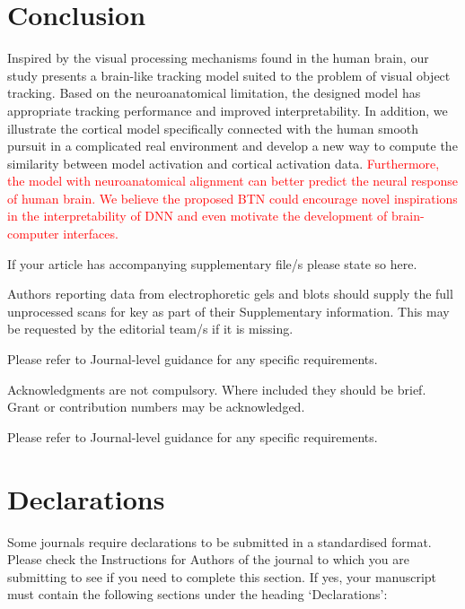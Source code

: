 \documentclass[sn-mathphys]{sn-jnl}%
\theoremstyle{thmstyleone}%
\theoremstyle{thmstyletwo}%
\theoremstyle{thmstylethree}%
\begin{document}
\section{Conclusion}\label{sec13}
Inspired by the visual processing mechanisms found in the human brain, our study presents a brain-like tracking model suited to the problem of visual object tracking. 
Based on the neuroanatomical limitation, the designed model has appropriate tracking performance and improved interpretability. 
In addition, we illustrate the cortical model specifically connected with the human smooth pursuit in a complicated real environment 
and develop a new way to compute the similarity between model activation and cortical activation data. 
\textcolor{red}{
	Furthermore, the model with neuroanatomical alignment can better predict the neural response of human brain. 
	We believe the proposed BTN could encourage novel inspirations in the interpretability of DNN 
	and even motivate the development of brain-computer interfaces.}






\backmatter


If your article has accompanying supplementary file/s please state so here. 

Authors reporting data from electrophoretic gels and blots should supply the full unprocessed scans for key as part of their Supplementary information. This may be requested by the editorial team/s if it is missing.

Please refer to Journal-level guidance for any specific requirements.


Acknowledgments are not compulsory. Where included they should be brief. Grant or contribution numbers may be acknowledged.

Please refer to Journal-level guidance for any specific requirements.

\section*{Declarations}

Some journals require declarations to be submitted in a standardised format. Please check the Instructions for Authors of the journal to which you are submitting to see if you need to complete this section. If yes, your manuscript must contain the following sections under the heading `Declarations':
\end{document}

